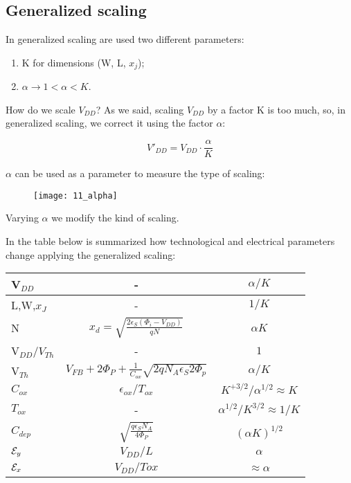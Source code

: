 \documentclass[a4paper, 12pt, twoside, openright]{report}
\begin{document}
\subsection{Generalized scaling}

In generalized scaling are used two different parameters:

	\begin{enumerate}
	\item K for dimensions (W, L, $x_{j}$);
	\item $\alpha \rightarrow 1< \alpha < K$.  
	\end{enumerate}

How do we scale $V_{DD}$? As we said, scaling $V_{DD}$ by a factor K is too much, so, in generalized scaling, we correct it using the factor $\alpha$:

	\begin{equation}
	V'_{DD} = V_{DD} \cdot \frac{\alpha}{K}
	\end{equation}

$\alpha$ can be used as a parameter to measure the type of scaling:

	\begin{figure}[H]
	\centering
	\texttt{[image: 11\_alpha]}
	\caption{}
	\label{}
	\end{figure}

Varying $\alpha$ we modify the kind of scaling.

In the table below is summarized how technological and electrical parameters change applying the generalized scaling:

\newpage

\begin{table}[H]
{
   \begin{center}
  {
     \begin{tabular}{||l||c|c||}\hline
      V$_{DD}$ & -& $ {\alpha/K}$\\
      \hline
      L,W,$x_J$       &- & $ {1/K}$\\
      \hline
      N & $x_d=\sqrt{\frac{2\epsilon_S(\Phi_i-V_{DD})}{qN}}$&$ {\alpha K}$ \\
      \hline
      V$_{DD}/V_{Th}$ &- & ${1}$\\
      \hline
      V$_{Th}$ & $V_{FB}+2\Phi_P+\frac{1}{C_{ox}}\sqrt{2qN_A\epsilon_S 2\Phi_p}$  & $ {\alpha/K}$\\
      \hline
       $C_{ox}$&  $\epsilon_{ox}/T_{ox}$ &$ {K}^{+3/2}/\alpha^{1/2}\approx K $\\ 
      \hline
      $T_{ox}$       &- & $ {\alpha^{1/2}/{K}^{3/2}}\approx 1/K$\\
      \hline
       $C_{dep}$&  $\sqrt{\frac{q\epsilon_SN_A}{4\Phi_P}}$ &$ {(\alpha K)}^{1/2}$\\ 
      \hline
      ${\cal E}_y$ & $V_{DD}/L$ & $ {\alpha}$\\
      \hline
      ${\cal E}_x$ & $V_{DD}/Tox$ & $ {\approx \alpha}$\\
      \hline
     \end{tabular}
}
    \end{center}
}
\end{table}
\end{document}
